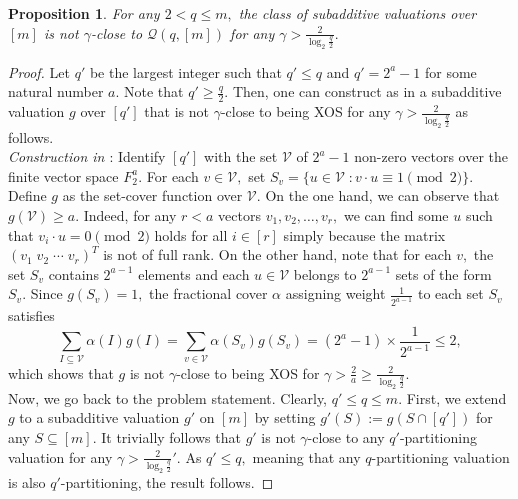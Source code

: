 \documentclass[11pt]{article}\usepackage{amsfonts}
\newtheorem{proposition}[theorem]{Proposition}
\numberwithin{theorem}{subsection}
\newcommand{\classqm}{\mathcal{Q}(q,[m])}
\begin{document}
\begin{proposition}
\label{lem:salogclose}
For any $2< q \le m,$ the class of subadditive valuations over $[m]$ is not $\gamma$-close to $\classqm$ for any
$\gamma >\frac{2}{\log_2 \frac{q}{2}}.$
\end{proposition}
\begin{proof}
Let $q'$ be the largest integer such that $q'\le q$ and $q' = 2^a - 1$ for some natural number $a.$ Note that $q' \ge \frac{q}{2}.$ Then, one can construct as in \cite[Appendix C]{BhawalkarR11} a subadditive valuation $g$ over $[q']$ that is not $\gamma$-close to being XOS for any $\gamma >\frac{2}{\log_2 \frac{q}{2}}$ as follows.\\

\noindent
\textit{Construction in \cite[Appendix C]{BhawalkarR11}}: 
Identify $[q']$ with the set $\mathcal{V}$ of $2^a-1$ non-zero vectors over the finite vector space $F_2^a.$ For each $v\in \mathcal{V},$ set $S_v= \{u \in \mathcal{V}\; : v\cdot u \equiv 1 \pmod{2}\}.$ Define $g$ as the set-cover function over $\mathcal{V}.$ On the one hand, we can observe that $g(\mathcal{V})\ge a.$ Indeed, for any $r<a$ vectors $v_1, v_2, \ldots, v_r,$ we can find some $u$ such that $v_i \cdot u = 0\pmod{2}$ holds for all $i\in[r]$ simply because the matrix $(v_1\; v_2\;\cdots\; v_r)^T$ is not of full rank. On the other hand, note that for each $v,$ the set $S_v$ contains $2^{a-1}$ elements and each $u\in \mathcal{V}$ belongs to $2^{a-1}$ sets of the form $S_v.$ Since $g(S_v) = 1,$ the fractional cover $\alpha$ assigning weight $\frac{1}{2^{a-1}}$ to each set $S_v$ satisfies 
$$
\sum_{I\subseteq \mathcal{V}} \alpha(I)g(I) = \sum_{v\in \mathcal{V}}
\alpha(S_v)g(S_v) = 
(2^{a}-1)\times \frac{1}{2^{a-1}}\le 2,
$$
which shows that $g$ is not $\gamma$-close to being XOS for $\gamma
>\frac{2}{a}\ge \frac{2}{\log_2 \frac{q}{2}}.$\\ 

\noindent
Now, we go back to the problem statement.
Clearly, $q'\le q\le m.$ First, we extend $g$ to a subadditive valuation $g'$ on $[m]$ by setting $g'(S):= g(S\cap [q'])$ for any $S\subseteq [m].$ It trivially follows that $g'$ is not $\gamma$-close to any $q'$-partitioning valuation for any $\gamma >\frac{2}{\log_2 \frac{q}{2}}'.$ As $q'\le q,$ meaning that any  $q$-partitioning valuation is also $q'$-partitioning, the result follows.
\end{proof}
\end{document}
